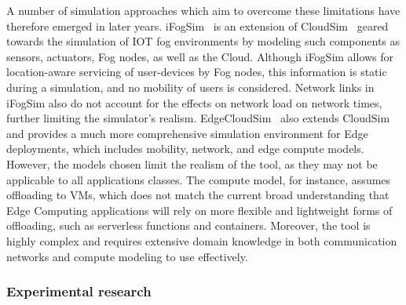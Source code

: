 A number of simulation approaches which aim to overcome these limitations have therefore emerged in later years.
iFogSim~\cite{gupta2017ifogsim} is an extension of CloudSim~\cite{calheiros2011cloudsim} geared towards the simulation of \gls{IOT} fog environments by modeling such components as sensors, actuators, Fog nodes, as well as the Cloud.
Although iFogSim allows for location-aware servicing of user-devices by Fog nodes, this information is static during a simulation, and no mobility of users is considered.
Network links in iFogSim also do not account for the effects on network load on network times, further limiting the simulator's realism.\@
EdgeCloudSim~\cite{sonmez2018edgecloudsim} also extends CloudSim~\cite{calheiros2011cloudsim} and provides a much more comprehensive simulation environment for Edge deployments, which includes mobility, network, and edge compute models.
However, the models chosen limit the realism of the tool, as they may not be applicable to all applications classes.
The compute model, for instance, assumes offloading to \glspl{VM}, which does not match the current broad understanding that Edge Computing applications will rely on more flexible and lightweight forms of offloading, such as serverless functions and containers.
Moreover, the tool is highly complex and requires extensive domain knowledge in both communication networks and compute modeling to use effectively.


\subsubsection{Experimental research}



